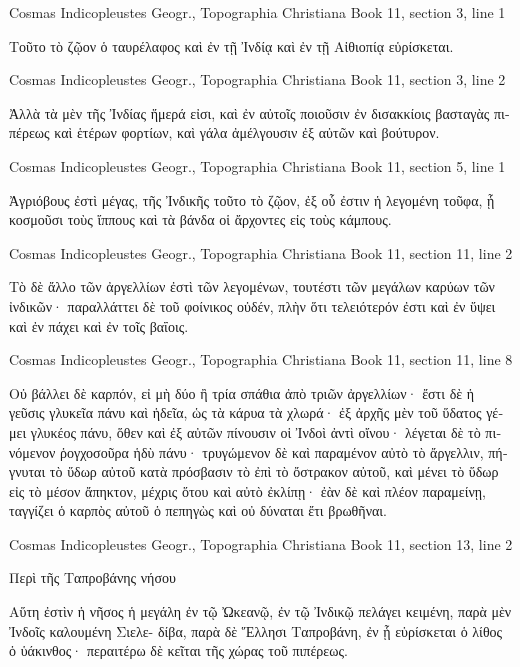 \documentclass[12pt,letterpaper,twoside,final]{memoir}
\begin{document}
\begin{greek}
Cosmas Indicopleustes Geogr., Topographia Christiana 
Book 11, section 3, line 1

Τοῦτο τὸ ζῷον ὁ ταυρέλαφος καὶ ἐν τῇ Ἰνδίᾳ καὶ ἐν τῇ 
Αἰθιοπίᾳ εὑρίσκεται. 



Cosmas Indicopleustes Geogr., Topographia Christiana 
Book 11, section 3, line 2

                           Ἀλλὰ τὰ μὲν τῆς Ἰνδίας ἥμερά εἰσι, 
καὶ ἐν αὐτοῖς ποιοῦσιν ἐν δισακκίοις βασταγὰς πιπέρεως καὶ 
ἑτέρων φορτίων, καὶ γάλα ἀμέλγουσιν ἐξ αὐτῶν καὶ βούτυρον. 



Cosmas Indicopleustes Geogr., Topographia Christiana 
Book 11, section 5, line 1

Ἀγριόβους ἐστὶ μέγας, τῆς Ἰνδικῆς τοῦτο τὸ ζῷον, ἐξ 
οὗ ἐστιν ἡ λεγομένη τοῦφα, ᾗ κοσμοῦσι τοὺς ἵππους καὶ τὰ 
βάνδα οἱ ἄρχοντες εἰς τοὺς κάμπους. 



Cosmas Indicopleustes Geogr., Topographia Christiana 
Book 11, section 11, line 2

Τὸ δὲ ἄλλο τῶν ἀργελλίων ἐστὶ τῶν λεγομένων, 
τουτέστι τῶν μεγάλων καρύων τῶν ἰνδικῶν· παραλλάττει δὲ 
τοῦ φοίνικος οὐδέν, πλὴν ὅτι τελειότερόν ἐστι καὶ ἐν ὕψει καὶ 
ἐν πάχει καὶ ἐν τοῖς βαΐοις. 



Cosmas Indicopleustes Geogr., Topographia Christiana 
Book 11, section 11, line 8

                                    Οὐ βάλλει δὲ καρπόν, εἰ μὴ δύο 
ἢ τρία σπάθια ἀπὸ τριῶν ἀργελλίων· ἔστι δὲ ἡ γεῦσις γλυκεῖα 
πάνυ καὶ ἡδεῖα, ὡς τὰ κάρυα τὰ χλωρά· ἐξ ἀρχῆς μὲν τοῦ 
ὕδατος γέμει γλυκέος πάνυ, ὅθεν καὶ ἐξ αὐτῶν πίνουσιν οἱ 
Ἰνδοὶ ἀντὶ οἴνου· λέγεται δὲ τὸ πινόμενον ῥογχοσοῦρα ἡδὺ 
πάνυ· τρυγώμενον δὲ καὶ παραμένον αὐτὸ τὸ ἄργελλιν, 
πήγνυται τὸ ὕδωρ αὐτοῦ κατὰ πρόσβασιν τὸ ἐπὶ τὸ ὄστρακον 
αὐτοῦ, καὶ μένει τὸ ὕδωρ εἰς τὸ μέσον ἄπηκτον, μέχρις ὅτου 
καὶ αὐτὸ ἐκλίπῃ· ἐὰν δὲ καὶ πλέον παραμείνῃ, ταγγίζει 
ὁ καρπὸς αὐτοῦ ὁ πεπηγὼς καὶ οὐ δύναται ἔτι βρωθῆναι. 



Cosmas Indicopleustes Geogr., Topographia Christiana 
Book 11, section 13, line 2

Περὶ τῆς Ταπροβάνης νήσου


 Αὕτη ἐστὶν ἡ νῆσος ἡ μεγάλη ἐν τῷ Ὠκεανῷ, ἐν τῷ 
Ἰνδικῷ πελάγει κειμένη, παρὰ μὲν Ἰνδοῖς καλουμένη Σιελε-
δίβα, παρὰ δὲ Ἕλλησι Ταπροβάνη, ἐν ᾗ εὑρίσκεται ὁ λίθος 
ὁ ὑάκινθος· περαιτέρω δὲ κεῖται τῆς χώρας τοῦ πιπέρεως. 




\end{greek}
\end{document}
